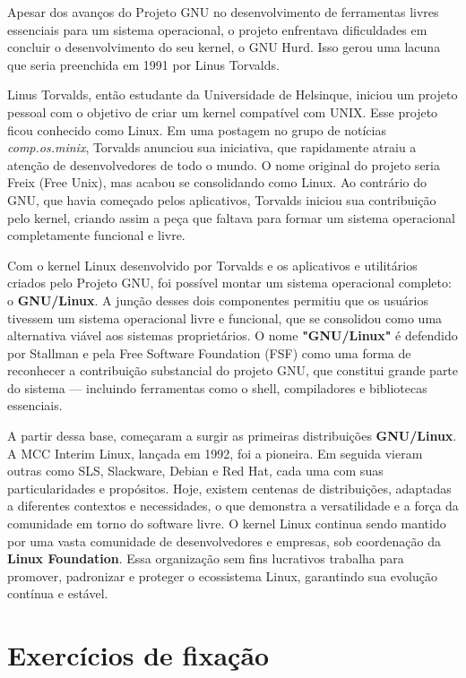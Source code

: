 \documentclass[12pt,oneside,a4paper]{abntex2}
\begin{document}
Apesar dos avanços do Projeto GNU no desenvolvimento de ferramentas livres essenciais para um sistema operacional, o projeto enfrentava dificuldades em concluir o desenvolvimento do seu kernel, o GNU Hurd. Isso gerou uma lacuna que seria preenchida em 1991 por Linus Torvalds.

Linus Torvalds, então estudante da Universidade de Helsinque, iniciou um projeto pessoal com o objetivo de criar um kernel compatível com UNIX. Esse projeto ficou conhecido como Linux. Em uma postagem no grupo de notícias \textit{comp.os.minix}, Torvalds anunciou sua iniciativa, que rapidamente atraiu a atenção de desenvolvedores de todo o mundo. O nome original do projeto seria Freix (Free Unix), mas acabou se consolidando como Linux. Ao contrário do GNU, que havia começado pelos aplicativos, Torvalds iniciou sua contribuição pelo kernel, criando assim a peça que faltava para formar um sistema operacional completamente funcional e livre.

Com o kernel Linux desenvolvido por Torvalds e os aplicativos e utilitários criados pelo Projeto GNU, foi possível montar um sistema operacional completo: o \textbf{GNU/Linux}. A junção desses dois componentes permitiu que os usuários tivessem um sistema operacional livre e funcional, que se consolidou como uma alternativa viável aos sistemas proprietários. O nome \textbf{"GNU/Linux"} é defendido por Stallman e pela Free Software Foundation (FSF) como uma forma de reconhecer a contribuição substancial do projeto GNU, que constitui grande parte do sistema — incluindo ferramentas como o shell, compiladores e bibliotecas essenciais.

A partir dessa base, começaram a surgir as primeiras distribuições \textbf{GNU/Linux}. A MCC Interim Linux, lançada em 1992, foi a pioneira. Em seguida vieram outras como SLS, Slackware, Debian e Red Hat, cada uma com suas particularidades e propósitos. Hoje, existem centenas de distribuições, adaptadas a diferentes contextos e necessidades, o que demonstra a versatilidade e a força da comunidade em torno do software livre. O kernel Linux continua sendo mantido por uma vasta comunidade de desenvolvedores e empresas, sob coordenação da \textbf{Linux Foundation}. Essa organização sem fins lucrativos trabalha para promover, padronizar e proteger o ecossistema Linux, garantindo sua evolução contínua e estável.

\section{Exercícios de fixação}
\end{document}
